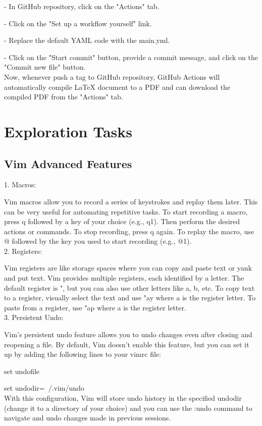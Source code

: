 \documentclass[12pt]{article}
\begin{document}
- In GitHub repository, click on the "Actions" tab.

- Click on the "Set up a workflow yourself" link.

- Replace the default YAML code with the main.yml.

- Click on the "Start commit" button, provide a commit message, and click on the "Commit new file" button.\\
Now, whenever push a tag to  GitHub repository, GitHub Actions will automatically compile  LaTeX document to a PDF and can download the compiled PDF from the "Actions" tab.

\section{Exploration Tasks}
\subsection{Vim Advanced Features}
1. Macros:

Vim macros allow you to record a series of keystrokes and replay them later. This can be very useful for automating repetitive tasks. To start recording a macro, press q followed by a key of your choice (e.g., q1). Then perform the desired actions or commands. To stop recording, press q again. To replay the macro, use @ followed by the key you used to start recording (e.g., @1).\\
2. Registers:

Vim registers are like storage spaces where you can copy and paste text or yank and put text. Vim provides multiple registers, each identified by a letter. The default register is ", but you can also use other letters like a, b, etc. To copy text to a register, visually select the text and use "ay where a is the register letter. To paste from a register, use "ap where a is the register letter.\\
3. Persistent Undo:

Vim's persistent undo feature allows you to undo changes even after closing and reopening a file. By default, Vim doesn't enable this feature, but you can set it up by adding the following lines to your vimrc file:

set undofile

set undodir=~/.vim/undo\\
With this configuration, Vim will store undo history in the specified undodir (change it to a directory of your choice) and you can use the :undo command to navigate and undo changes made in previous sessions.
\end{document}
